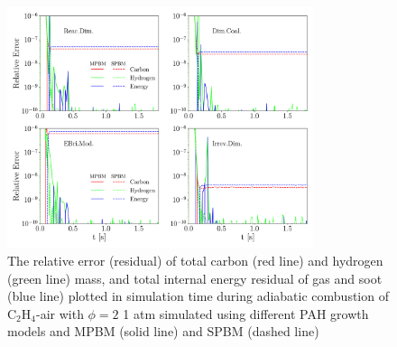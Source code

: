 \begin{figure}[H]
	\centering
	\includegraphics[width=0.8\textwidth]{Figures/Results/Validation/PSR/relerr_psr.pdf}
	\caption{The relative error (residual) of total carbon (red line) and hydrogen (green line) mass, and total internal energy residual of gas and soot (blue line) plotted in simulation time during adiabatic combustion of $\mathrm{C_2H_4}$-air with $\phi=2$ 1 atm simulated using different PAH growth models and MPBM (solid line) and SPBM (dashed line)}
	\label{fig:psrvalid}
\end{figure}